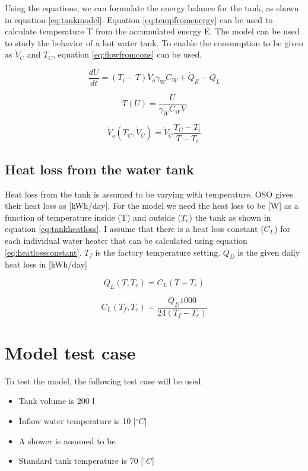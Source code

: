 \documentclass[11pt]{article} %
\begin{document}
Using the equations, we can formulate the energy balance for the tank, as shown in equation \ref{eq:tankmodel}. Equation \ref{eq:tempfromenergy} can be used to calculate temperature T from the accumulated energy E. The model can be used to study the behavior of a hot water tank. To enable the consumption to be given as $\dot{V} _C$ and $T_C$, equation \ref{eq:flowfromcons} can be used.

\begin{equation} \label{eq:tankmodel}
\frac{dU}{dt} = (T_i-T) \dot{V}_o \gamma _W C_W + \dot{Q}_E - \dot{Q}_L
\end{equation}

\begin{equation} \label{eq:tempfromenergy}
T(U) = \frac{U}{\gamma _W C_W V}
\end{equation}

\begin{equation} \label{eq:flowfromcons}
\dot{V}_o (T_C,\dot{V} _C) = \dot{V} _C \frac{T_C - T_i}{T-T_i}
\end{equation}

\subsection{Heat loss from the water tank}
Heat loss from the tank is assumed to be varying with temperature. OSO gives their heat loss as [kWh/day]. For the model we need the heat loss to be [W] as a function of temperature inside (T) and outside ($T_e$) the tank as shown in equation \ref{eq:tankheatloss}. I assume that there is a heat loss constant ($C_L$) for each individual water heater that can be calculated using equation \ref{eq:heatlossconstant}. $T_f$ is the factory temperature setting.  $Q_D$ is the given daily heat loss in [kWh/day]

\begin{equation} \label{eq:tankheatloss}
Q_L(T,T_e) = C_L ( T - T_e )
\end{equation}

\begin{equation} \label{eq:heatlossconstant}
C_L(T_f, T_e) = \frac{Q_D 1000}{24 (T_f - T_e)}
\end{equation}


\section{Model test case}
To test the model, the following test case will be used.
\begin{itemize}
	\item Tank volume is 200 l
	\item Inflow water temperature is 10 [$^{\circ}C$]
	\item A shower is assumed to be 
	\item Standard tank temperature is 70 [$^{\circ}C$]
\end{itemize}




{}

\end{document}
